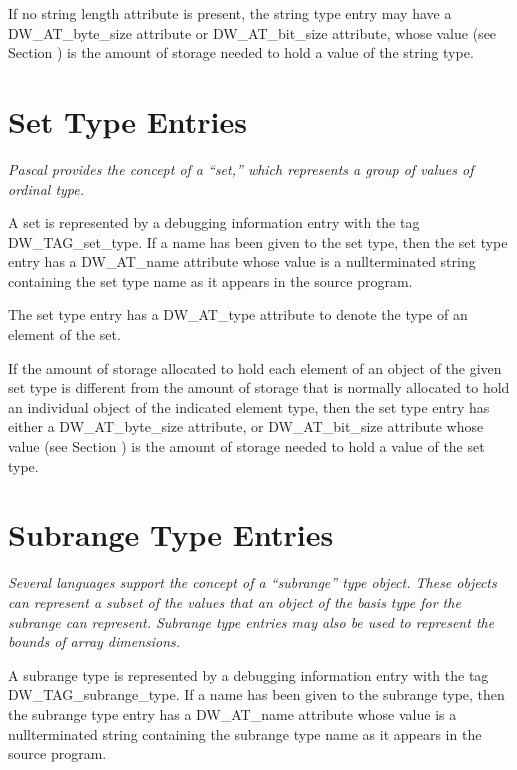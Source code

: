 If no string length attribute is present, the string type
entry may have a DW\_AT\_byte\_size attribute or DW\_AT\_bit\_size
attribute, whose value 
(see Section ) 
is the amount of
storage needed to hold a value of the string type.


\section{Set Type Entries}
\label{chap:settypeentries}

\textit{Pascal provides the concept of a “set,” which represents
a group of values of ordinal type.}

A set is represented by a debugging information entry with
the tag DW\_TAG\_set\_type. If a name has been given to the
set type, then the set type entry has a DW\_AT\_name attribute
whose value is a null\dash terminated string containing the
set type name as it appears in the source program.

The set type entry has a DW\_AT\_type attribute to denote the
type of an element of the set.

If the amount of storage allocated to hold each element of an
object of the given set type is different from the amount of
storage that is normally allocated to hold an individual object
of the indicated element type, then the set type entry has
either a DW\_AT\_byte\_size attribute, or DW\_AT\_bit\_size attribute
whose value (see Section ) is
the amount of storage needed to hold a value of the set type.


\section{Subrange Type Entries}
\label{chap:subrangetypeentries}

\textit{Several languages support the concept of a ``subrange''
type object. These objects can represent a subset of the
values that an object of the basis type for the subrange can
represent. Subrange type entries may also be used to represent
the bounds of array dimensions.}

A subrange type is represented by a debugging information
entry with the tag DW\_TAG\_subrange\_type. If a name has been
given to the subrange type, then the subrange type entry
has a DW\_AT\_name attribute whose value is a null\dash terminated
string containing the subrange type name as it appears in
the source program.

